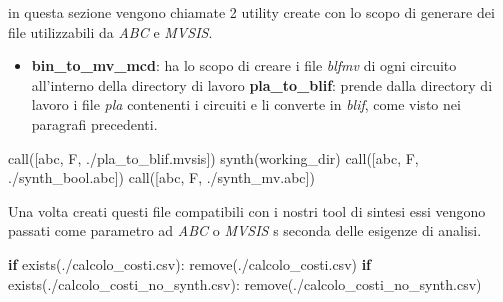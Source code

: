\documentclass[
  italian,
]{book}
\newenvironment{Shaded}{\begin{snugshade}}{\end{snugshade}}
\newcommand{\ControlFlowTok}[1]{\textcolor[rgb]{0.13,0.29,0.53}{\textbf{#1}}}
\newcommand{\NormalTok}[1]{#1}
\newcommand{\StringTok}[1]{\textcolor[rgb]{0.31,0.60,0.02}{#1}}
\providecommand{\tightlist}{%
  \setlength{\itemsep}{0pt}\setlength{\parskip}{0pt}}
\begin{document}
in questa sezione vengono chiamate 2 utility create con lo scopo di generare dei file utilizzabili da \emph{ABC} e \emph{MVSIS}.

\begin{itemize}
\tightlist
\item
  \textbf{bin\_to\_mv\_mcd}: ha lo scopo di creare i file \emph{blfmv} di ogni circuito all'interno della directory di lavoro
  \textbf{pla\_to\_blif}: prende dalla directory di lavoro i file \emph{pla} contenenti i circuiti e li converte in \emph{blif}, come visto nei paragrafi precedenti.
\end{itemize}

\begin{Shaded}
\begin{Highlighting}[]
\NormalTok{call([}\StringTok{\textquotesingle{}abc\textquotesingle{}}\NormalTok{, }\StringTok{\textquotesingle{}{-}F\textquotesingle{}}\NormalTok{, }\StringTok{\textquotesingle{}./pla\_to\_blif.mvsis\textquotesingle{}}\NormalTok{])}
\NormalTok{synth(working\_dir)}
\NormalTok{call([}\StringTok{\textquotesingle{}abc\textquotesingle{}}\NormalTok{, }\StringTok{\textquotesingle{}{-}F\textquotesingle{}}\NormalTok{, }\StringTok{\textquotesingle{}./synth\_bool.abc\textquotesingle{}}\NormalTok{])}
\NormalTok{call([}\StringTok{\textquotesingle{}abc\textquotesingle{}}\NormalTok{, }\StringTok{\textquotesingle{}{-}F\textquotesingle{}}\NormalTok{, }\StringTok{\textquotesingle{}./synth\_mv.abc\textquotesingle{}}\NormalTok{])}
\end{Highlighting}
\end{Shaded}

Una volta creati questi file compatibili con i nostri tool di sintesi essi vengono passati come parametro ad \emph{ABC} o \emph{MVSIS} s seconda delle esigenze di analisi.

\begin{Shaded}
\begin{Highlighting}[]
\ControlFlowTok{if}\NormalTok{ exists(}\StringTok{\textquotesingle{}./calcolo\_costi.csv\textquotesingle{}}\NormalTok{):}
\NormalTok{    remove(}\StringTok{\textquotesingle{}./calcolo\_costi.csv\textquotesingle{}}\NormalTok{)}
\ControlFlowTok{if}\NormalTok{ exists(}\StringTok{\textquotesingle{}./calcolo\_costi\_no\_synth.csv\textquotesingle{}}\NormalTok{):}
\NormalTok{    remove(}\StringTok{\textquotesingle{}./calcolo\_costi\_no\_synth.csv\textquotesingle{}}\NormalTok{)}
\end{Highlighting}
\end{Shaded}
\end{document}
